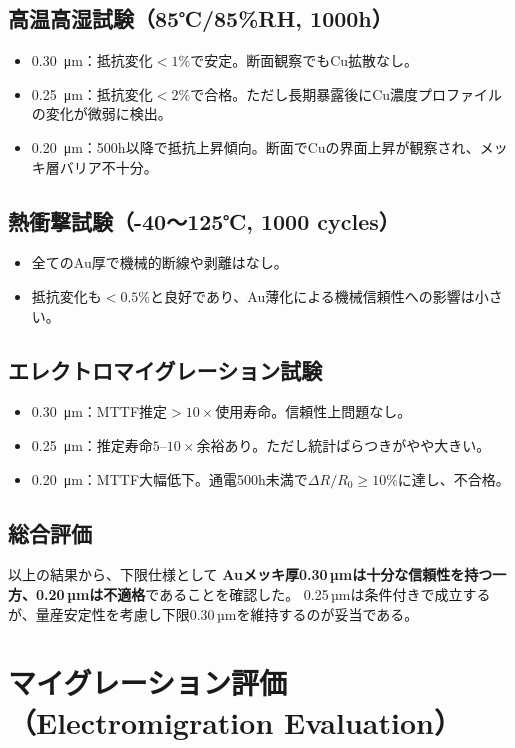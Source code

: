 \documentclass[conference]{IEEEtran}
\begin{document}
\subsection*{高温高湿試験（85℃/85\%RH, 1000h）}
\begin{itemize}
  \item \SI{0.30}{\micro\meter}：抵抗変化$<1\%$で安定。断面観察でもCu拡散なし。
  \item \SI{0.25}{\micro\meter}：抵抗変化$<2\%$で合格。ただし長期暴露後にCu濃度プロファイルの変化が微弱に検出。
  \item \SI{0.20}{\micro\meter}：500h以降で抵抗上昇傾向。断面でCuの界面上昇が観察され、メッキ層バリア不十分。
\end{itemize}

\subsection*{熱衝撃試験（-40～125℃, 1000 cycles）}
\begin{itemize}
  \item 全てのAu厚で機械的断線や剥離はなし。
  \item 抵抗変化も$<0.5\%$と良好であり、Au薄化による機械信頼性への影響は小さい。
\end{itemize}

\subsection*{エレクトロマイグレーション試験}
\begin{itemize}
  \item \SI{0.30}{\micro\meter}：MTTF推定$>10\times$使用寿命。信頼性上問題なし。
  \item \SI{0.25}{\micro\meter}：推定寿命$5$--$10\times$余裕あり。ただし統計ばらつきがやや大きい。
  \item \SI{0.20}{\micro\meter}：MTTF大幅低下。通電500h未満で$\Delta R/R_0 \geq 10\%$に達し、不合格。
\end{itemize}

\subsection*{総合評価}
以上の結果から、下限仕様として
\textbf{Auメッキ厚0.30\,µmは十分な信頼性を持つ一方、0.20\,µmは不適格}であることを確認した。
0.25\,µmは条件付きで成立するが、量産安定性を考慮し下限0.30\,µmを維持するのが妥当である。

\section{マイグレーション評価（Electromigration Evaluation）}
\end{document}
